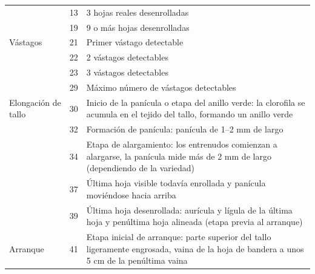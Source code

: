 \begin{longtable}{p{3cm}p{1cm}p{9cm}}
                                           & 13   & 3 hojas reales desenrolladas                                                                                                             \\
                                           & 19   & 9 o más hojas desenrolladas                                                                                                              \\ \hline
Vástagos                                   & 21   & Primer vástago detectable                                                                                                                \\
                                           & 22   & 2 vástagos detectables                                                                                                                   \\
                                           & 23   & 3 vástagos detectables                                                                                                                   \\
                                           & 29   & Máximo número de vástagos detectables                                                                                                    \\ \hline
Elongación de tallo                        & 30   & Inicio de la panícula o etapa del anillo verde: la clorofila se acumula en el tejido del tallo, formando un anillo verde                 \\
                                           & 32   & Formación de panícula: panícula de 1–2 mm de largo                                                                                       \\
                                           & 34   & Etapa de alargamiento: los entrenudos comienzan a alargarse, la panícula mide más de 2 mm de largo (dependiendo de la variedad)          \\
                                           & 37   & Última hoja visible todavía enrollada y panícula moviéndose hacia arriba                                                                 \\
                                           & 39   & Última hoja desenrollada: aurícula y lígula de la última hoja y penúltima hoja alineada (etapa previa al arranque)                       \\ \hline
Arranque                                   & 41   & Etapa inicial de arranque: parte superior del tallo ligeramente engrosada, vaina de la hoja de bandera a unos 5 cm de la penúltima vaina \\

\end{longtable}
